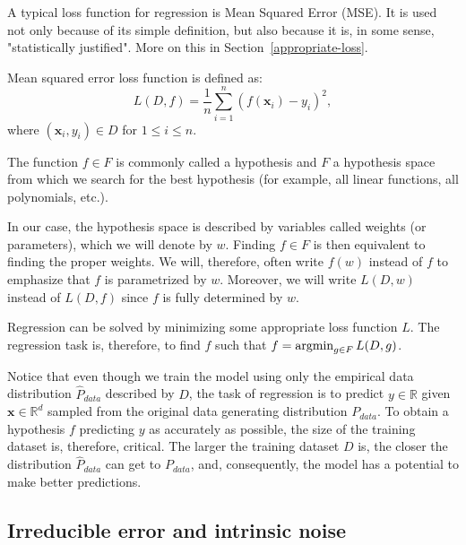 A typical loss function for regression is Mean Squared Error (MSE). It is used not only because of its simple definition, but also because it is, in some sense, "statistically justified". More on this in Section~\ref{appropriate-loss}.

\begin{defn}\label{def01:5}
	Mean squared error loss function is defined as:
	\begin{equation}
	L(D, f) = \frac{1}{n} \sum_{i=1}^n (f(\textbf{x}_i) - y_i)^2,
	\end{equation}
	where $(\textbf{x}_i, y_i) \in D$ for $1 \leq i \leq n$.
\end{defn}

\begin{defn}\label{def01:4}
	The function $f \in F$ is commonly called a hypothesis and $F$ a hypothesis space from which we search for the best hypothesis (for example, all linear functions, all polynomials, etc.). 
\end{defn}

In our case, the hypothesis space is described by variables called weights (or parameters), which we will denote by $w$. Finding $f \in F$ is then equivalent to finding the proper weights. We will, therefore, often write $f(w)$ instead of $f$ to emphasize that $f$ is parametrized by $w$. Moreover, we will write $L(D, w)$ instead of $L(D, f)$ since $f$ is fully determined by $w$.

Regression can be solved by minimizing some appropriate loss function $L$. The regression task is, therefore, to find $f$ such that $f = \operatorname*{argmin}_{g \in F} L(D, g)$. 

Notice that even though we train the model using only the empirical data distribution $\hat{P}_{data}$ described by $D$, the task of regression is to predict $y \in \mathbb{R}$ given $\textbf{x} \in \mathbb{R}^d$ sampled from the original data generating distribution $P_{data}$. To obtain a hypothesis $f$ predicting $y$ as accurately as possible, the size of the training dataset is, therefore, critical. The larger the training dataset $D$ is, the closer the distribution $\hat{P}_{data}$ can get to $P_{data}$, and, consequently, the model has a potential to make better predictions.

\subsection{Irreducible error and intrinsic noise}



